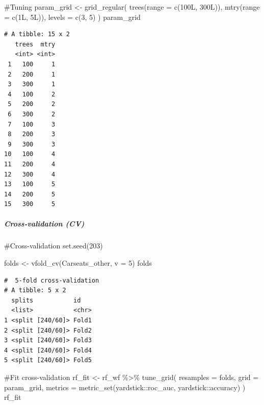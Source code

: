 \documentclass[
]{article}
\let\oldsubparagraph\subparagraph
\renewcommand{\subparagraph}[1]{\oldsubparagraph{#1}\mbox{}}
\newenvironment{Shaded}{\begin{snugshade}}{\end{snugshade}}
\newcommand{\AttributeTok}[1]{\textcolor[rgb]{0.40,0.45,0.13}{#1}}
\newcommand{\CommentTok}[1]{\textcolor[rgb]{0.37,0.37,0.37}{#1}}
\newcommand{\DecValTok}[1]{\textcolor[rgb]{0.68,0.00,0.00}{#1}}
\newcommand{\FunctionTok}[1]{\textcolor[rgb]{0.28,0.35,0.67}{#1}}
\newcommand{\NormalTok}[1]{\textcolor[rgb]{0.00,0.23,0.31}{#1}}
\newcommand{\OtherTok}[1]{\textcolor[rgb]{0.00,0.23,0.31}{#1}}
\newcommand{\SpecialCharTok}[1]{\textcolor[rgb]{0.37,0.37,0.37}{#1}}
\begin{document}
\begin{Shaded}
\begin{Highlighting}[]
\CommentTok{\#Tuning}
\NormalTok{param\_grid }\OtherTok{\textless{}{-}} \FunctionTok{grid\_regular}\NormalTok{(}
  \FunctionTok{trees}\NormalTok{(}\AttributeTok{range =} \FunctionTok{c}\NormalTok{(100L, 300L)), }
  \FunctionTok{mtry}\NormalTok{(}\AttributeTok{range =} \FunctionTok{c}\NormalTok{(1L, 5L)),}
  \AttributeTok{levels =} \FunctionTok{c}\NormalTok{(}\DecValTok{3}\NormalTok{, }\DecValTok{5}\NormalTok{)}
\NormalTok{  )}
\NormalTok{param\_grid}
\end{Highlighting}
\end{Shaded}

\begin{verbatim}
# A tibble: 15 x 2
   trees  mtry
   <int> <int>
 1   100     1
 2   200     1
 3   300     1
 4   100     2
 5   200     2
 6   300     2
 7   100     3
 8   200     3
 9   300     3
10   100     4
11   200     4
12   300     4
13   100     5
14   200     5
15   300     5
\end{verbatim}

\hypertarget{cross-validation-cv-1}{%
\subparagraph{Cross-validation (CV)}\label{cross-validation-cv-1}}

\begin{Shaded}
\begin{Highlighting}[]
\CommentTok{\#Cross{-}validation}
\FunctionTok{set.seed}\NormalTok{(}\DecValTok{203}\NormalTok{)}

\NormalTok{folds }\OtherTok{\textless{}{-}} \FunctionTok{vfold\_cv}\NormalTok{(Carseats\_other, }\AttributeTok{v =} \DecValTok{5}\NormalTok{)}
\NormalTok{folds}
\end{Highlighting}
\end{Shaded}

\begin{verbatim}
#  5-fold cross-validation 
# A tibble: 5 x 2
  splits           id   
  <list>           <chr>
1 <split [240/60]> Fold1
2 <split [240/60]> Fold2
3 <split [240/60]> Fold3
4 <split [240/60]> Fold4
5 <split [240/60]> Fold5
\end{verbatim}

\begin{Shaded}
\begin{Highlighting}[]
\CommentTok{\#Fit cross{-}validation}
\NormalTok{rf\_fit }\OtherTok{\textless{}{-}}\NormalTok{ rf\_wf }\SpecialCharTok{\%\textgreater{}\%}
  \FunctionTok{tune\_grid}\NormalTok{(}
    \AttributeTok{resamples =}\NormalTok{ folds,}
    \AttributeTok{grid =}\NormalTok{ param\_grid,}
    \AttributeTok{metrics =} \FunctionTok{metric\_set}\NormalTok{(yardstick}\SpecialCharTok{::}\NormalTok{roc\_auc,}
\NormalTok{                         yardstick}\SpecialCharTok{::}\NormalTok{accuracy)}
\NormalTok{    )}
\NormalTok{rf\_fit}
\end{Highlighting}
\end{Shaded}
\end{document}
